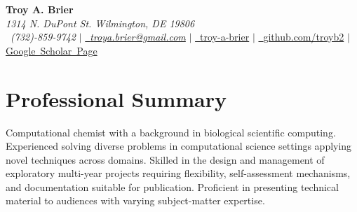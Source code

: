 \documentclass[letterpaper,10pt]{article}
\makeatletter
\newcommand{\sectionspace}{
\vspace{-17pt}
}
\newcommand{\subheadingtitlevspace}{
\vspace{-3pt}
}
\newcommand{\titleItem}[1]{
  \textbf{#1}
}
\newcommand{\resumeProjectHeading}[2]{
    \item
    \begin{tabular*}{0.97\textwidth}{l@{\extracolsep{\fill}}r}
      #1 & \textit{ #2} \\
    \end{tabular*}\vspace{-9pt}
}
\newcommand{\resumeSubHeadingListStart}{\subheadingtitlevspace\begin{itemize}[leftmargin=0.15in, label={}]}
\newcommand{\resumeSubHeadingListEnd}{\end{itemize}}
\makeatother
\begin{document}
\begin{flushleft}
    \textbf{\LARGE Troy A. Brier} \\    
    \textcolor{color1}{\textit{1314 N. DuPont St. Wilmington, DE 19806}} \\
    \Mobilefone~\textcolor{color1}{\textit{(732)-859-9742}} {\large $|$}
    \href{mailto:troya.brier@gmail.com}{{\Letter~\textcolor{color1}{\textit{troya.brier@gmail.com}}}}
    {\large $|$}
    \href{https://www.linkedin.com/in/troy-a-brier/}{\faLinkedin~\textcolor{color1}{troy-a-brier}}
    {\large $|$}
    \href{https://github.com/troyb2}{\Keyboard~\textcolor{color1}{github.com/troyb2}}
    {\large $|$}
    \href{https://scholar.google.com/citations?user=DyTEVjEAAAAJ&hl=en}{\textcolor{color1}{Google~Scholar~Page}}
    \vspace{-8pt}
\end{flushleft}

\section{\textcolor{color1}{Professional Summary}}
\vspace{-3pt}
\begin{itemize}[leftmargin=0.15in, label={}]
    {\item{
        {Computational chemist with a background in biological scientific computing.
         Experienced solving diverse problems in computational science settings applying novel techniques across domains.
         Skilled in the design and management of exploratory multi-year projects requiring flexibility, self-assessment mechanisms, and documentation suitable for publication.
         Proficient in presenting technical material to audiences with varying subject-matter expertise.
        } \\
    }}
 \end{itemize}
 \sectionspace
\vspace{3pt}


          
\end{document}
